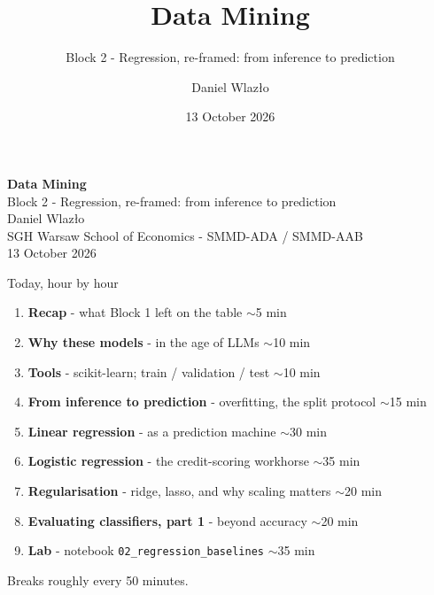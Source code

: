\documentclass[10pt,aspectratio=169]{beamer}
\title[Data Mining]{Data Mining}
\subtitle{Block 2 - Regression, re-framed: from inference to prediction}
\author{Daniel Wlazło}
\institute{SGH Warsaw School of Economics - SMMD-ADA / SMMD-AAB}
\date{13 October 2026}
\begin{document}
\begin{frame}[plain]
  \begin{center}
    \vspace{1cm}
    {\LARGE\textbf{Data Mining}}\\[0.5cm]
    {\large Block 2 - Regression, re-framed: from inference to prediction}\\[1.5cm]
    {\large Daniel Wlazło} \\[0.2cm]
    {\small SGH Warsaw School of Economics - SMMD-ADA / SMMD-AAB} \\[0.2cm]
    {\small 13 October 2026}
  \end{center}
\end{frame}

\begin{frame}{Today, hour by hour}
  \begin{enumerate}\small
    \item \textbf{Recap} - what Block 1 left on the table \hfill {\small$\sim$5 min}
    \item \textbf{Why these models} - in the age of LLMs \hfill {\small$\sim$10 min}
    \item \textbf{Tools} - scikit-learn; train / validation / test \hfill {\small$\sim$10 min}
    \item \textbf{From inference to prediction} - overfitting, the split protocol \hfill {\small$\sim$15 min}
    \item \textbf{Linear regression} - as a prediction machine \hfill {\small$\sim$30 min}
    \item \textbf{Logistic regression} - the credit-scoring workhorse \hfill {\small$\sim$35 min}
    \item \textbf{Regularisation} - ridge, lasso, and why scaling matters \hfill {\small$\sim$20 min}
    \item \textbf{Evaluating classifiers, part 1} - beyond accuracy \hfill {\small$\sim$20 min}
    \item \textbf{Lab} - notebook \texttt{02\_regression\_baselines} \hfill {\small$\sim$35 min}
  \end{enumerate}
  \vspace{0.4em}
  \begin{center}\small Breaks roughly every 50 minutes.\end{center}
\end{frame}
\end{document}
